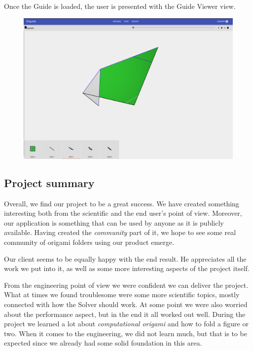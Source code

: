 Once the Guide is loaded, the user is presented with the Guide Viewer view.

\begin{figure}[H]
  	\centering
    \includegraphics[width=\textwidth]{assets/5-folderView.png}
\end{figure}


\subsection{Project summary}

Overall, we find our project to be a great success.
We have created something interesting both from the scientific and the end user's
point of view. Moreover, our application is something that can be used
by anyone as it is publicly available. Having created the \textit{community}
part of it, we hope to see some real community of origami folders using our product emerge.
\smallskip

Our client seems to be equally happy with the end result.
He appreciates all the work we put into it, 
as well as some more interesting aspects of the project itself.
\smallskip

From the engineering point of view we were confident we can deliver the project.
What at times we found troublesome were some more scientific topics, mostly
connected with how the Solver should work.
At some point we were also worried about the performance aspect, but in the end it all worked out well.
During the project we learned a lot about \textit{computational origami} and how to fold a figure or two.
When it comes to the engineering, we did not learn much, but
that is to be expected since we already had some solid foundation in this area.
\smallskip

